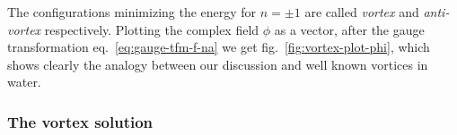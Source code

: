 \documentclass[../main/main.tex]{subfiles}
\begin{document}
The configurations minimizing the energy for $n=\pm1$ are called \emph{vortex} and \emph{anti-vortex} respectively. Plotting the complex field $\phi$ as a vector, after the gauge transformation eq.~\eqref{eq:gauge-tfm-f-na} we get fig.~\ref{fig:vortex-plot-phi}, which shows clearly the analogy between our discussion and well known vortices in water. 
\subsubsection{The vortex solution}
\end{document}
